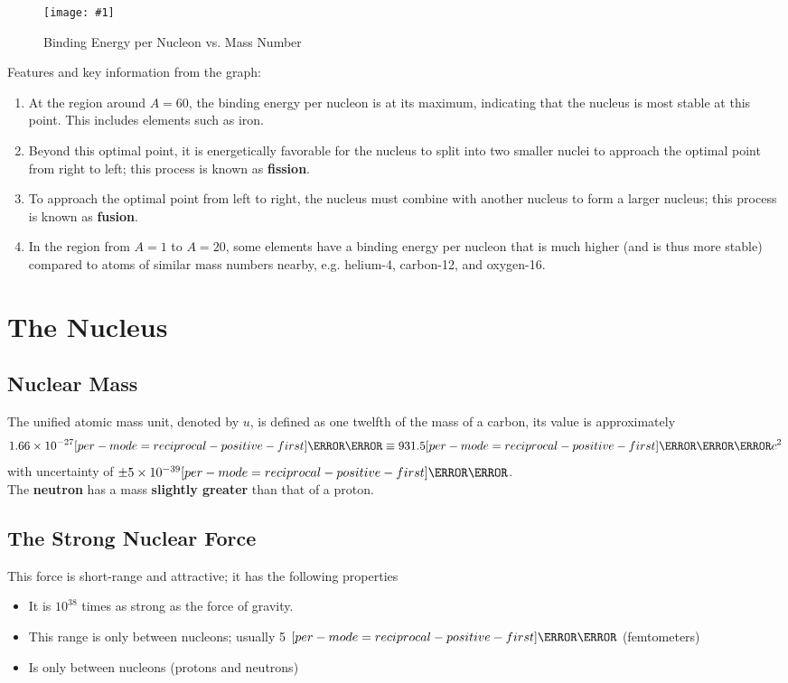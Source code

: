 \documentclass[a4paper,12pt]{article}
\let\oldsection\section
\renewcommand\section{\clearpage\oldsection}
\let\oldsi\si
\renewcommand{\si}[1]{\oldsi[per-mode=reciprocal-positive-first]{#1}}
\newcommand{\lb}{\\[8pt]}
\newcommand{\img}[4]{\begin{center}
  \begin{figure}[H]
    \centering
    \texttt{[image: \#1]}
    \caption{#3}
    \label{fig:#4}
  \end{figure}
\end{center}}
\begin{document}
\img{BE_A plot.png}{0.8}{Binding Energy per Nucleon vs. Mass Number}{BE_A}

Features and key information from the graph:
\begin{enumerate}
  \item At the region around $A = 60$, the binding energy per nucleon is at its maximum, indicating that the nucleus is most stable at this point. This includes elements such as iron.
  \item Beyond this optimal point, it is energetically favorable for the nucleus to split into two smaller nuclei to approach the optimal point from right to left; this process is known as \textbf{fission}.
  \item To approach the optimal point from left to right, the nucleus must combine with another nucleus to form a larger nucleus; this process is known as \textbf{fusion}.
  \item In the region from $A = 1$ to $A = 20$, some elements have a binding energy per nucleon that is much higher (and is thus more stable) compared to atoms of similar mass numbers nearby, e.g. helium-4, carbon-12, and oxygen-16.
\end{enumerate}

\section{The Nucleus}

\subsection{Nuclear Mass}

The unified atomic mass unit, denoted by $u$, is defined as one twelfth of the mass of a carbon, its value is approximately $$1.66 \times 10^{-27} \si{\kilo\gram} \equiv 931.5 \si{\mega\electronvolt\per c^2}$$
with uncertainty of $\pm 5\times 10^{-39} \si{\kilo\gram}$.\lb
The \textbf{neutron} has a mass \textbf{slightly greater} than that of a proton.

\subsection{The Strong Nuclear Force}

This force is short-range and attractive; it has the following properties
\begin{itemize}
  \item It is $10^{38}$ times as strong as the force of gravity.
  \item This range is only between nucleons; usually 5 $\si{\femto\m}$ (femtometers)
  \item Is only between nucleons (protons and neutrons)
\end{itemize}
\end{document}
